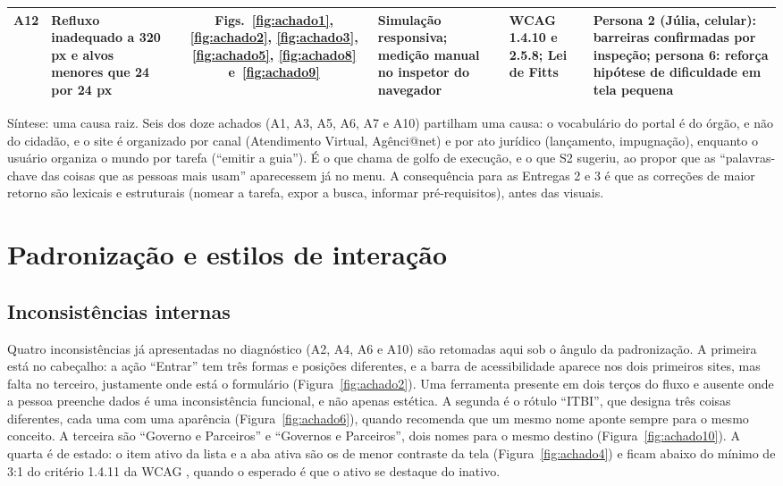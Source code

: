 \documentclass[
  12pt,
  oneside,
  a4paper,
  chapter=TITLE,
  section=TITLE,
  english,
  brazilian
]{abntex2}
\renewcommand{\fonte}[1]{\par\vspace{3pt}{\footnotesize\raggedright\noindent Fonte: #1\par}\vspace{4pt}}%
\begin{document}
\begin{landscape}
\begin{quadro}[!htbp]
\begin{tabularx}{\linewidth}{|c|Y|c|p{3.2cm}|p{4.2cm}|Y|}
    A12 & Refluxo inadequado a 320 px e alvos menores que 24 por 24 px & Figs.~\ref{fig:achado1}, \ref{fig:achado2}, \ref{fig:achado3}, \ref{fig:achado5}, \ref{fig:achado8} e~\ref{fig:achado9} & Simulação responsiva; medição manual no inspetor do navegador & WCAG 1.4.10 e 2.5.8; Lei de Fitts & Persona 2 (Júlia, celular): barreiras confirmadas por inspeção; persona 6: reforça hipótese de dificuldade em tela pequena \\\hline
  \end{tabularx}
  \fonte{Elaborado pelos autores (2026).}
\end{quadro}
\end{landscape}



Síntese: uma causa raiz. Seis dos doze achados (A1, A3, A5, A6, A7 e A10) partilham uma causa: o vocabulário do portal é do órgão, e não do
cidadão, e o site é organizado por canal (Atendimento Virtual, Agênci@net) e
por ato jurídico (lançamento, impugnação), enquanto o usuário organiza o mundo
por tarefa (``emitir a guia''). É o que  chama de golfo de execução, e
o que S2 sugeriu, ao propor que as ``palavras-chave das coisas que as pessoas
mais usam'' aparecessem já no menu. A consequência para as Entregas 2 e 3 é que
as correções de maior retorno são lexicais e estruturais (nomear a tarefa,
expor a busca, informar pré-requisitos), antes das visuais.

\chapter{Padronização e estilos de interação}\label{cap:padronizacao}

\section{Inconsistências internas}\label{sec:padr-int}

Quatro inconsistências já apresentadas no diagnóstico (A2, A4, A6 e A10) são retomadas aqui sob o ângulo da padronização. A primeira está no cabeçalho: a ação ``Entrar'' tem três formas e posições diferentes, e a barra de acessibilidade aparece nos dois primeiros sites, mas falta no terceiro, justamente onde está o formulário (Figura~\ref{fig:achado2}). Uma ferramenta presente em dois terços do fluxo e ausente onde a pessoa preenche dados é uma inconsistência funcional, e não apenas estética. A segunda é o rótulo ``ITBI'', que designa três coisas diferentes, cada uma com uma aparência (Figura~\ref{fig:achado6}), quando  recomenda que um mesmo nome aponte sempre para o mesmo conceito. A terceira são ``Governo e Parceiros'' e ``Governos e Parceiros'', dois nomes para o mesmo destino (Figura~\ref{fig:achado10}). A quarta é de estado: o item ativo da lista e a aba ativa são os de menor contraste da tela (Figura~\ref{fig:achado4}) e ficam abaixo do mínimo de 3:1 do critério 1.4.11 da WCAG \cite{wcag22}, quando o esperado é que o ativo se destaque do inativo.
\end{document}
